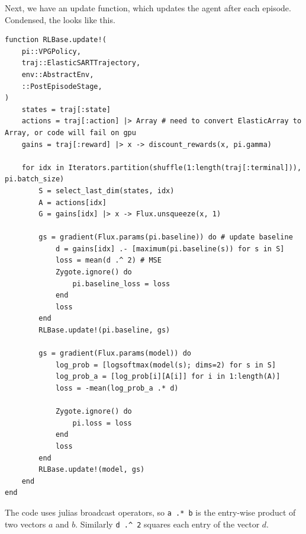 \documentclass{article}
\theoremstyle{changedot}
\theoremstyle{changedotbreak}
\theoremstyle{nonumberplain}
\begin{document}
Next, we have an update function, which updates the agent after each episode. Condensed, the looks like this.

\begin{verbatim}
function RLBase.update!(
    pi::VPGPolicy,
    traj::ElasticSARTTrajectory,
    env::AbstractEnv,
    ::PostEpisodeStage,
)
    states = traj[:state]
    actions = traj[:action] |> Array # need to convert ElasticArray to Array, or code will fail on gpu
    gains = traj[:reward] |> x -> discount_rewards(x, pi.gamma)

    for idx in Iterators.partition(shuffle(1:length(traj[:terminal])), pi.batch_size)
        S = select_last_dim(states, idx)
        A = actions[idx]
        G = gains[idx] |> x -> Flux.unsqueeze(x, 1)

        gs = gradient(Flux.params(pi.baseline)) do # update baseline
            d = gains[idx] .- [maximum(pi.baseline(s)) for s in S]
            loss = mean(d .^ 2) # MSE
            Zygote.ignore() do
                pi.baseline_loss = loss
            end
            loss
        end
        RLBase.update!(pi.baseline, gs)

        gs = gradient(Flux.params(model)) do
            log_prob = [logsoftmax(model(s); dims=2) for s in S]
            log_prob_a = [log_prob[i][A[i]] for i in 1:length(A)]
            loss = -mean(log_prob_a .* d)

            Zygote.ignore() do
                pi.loss = loss
            end
            loss
        end
        RLBase.update!(model, gs)
    end
end
\end{verbatim}

The code uses julias broadcast operators, so \texttt{a .* b} is the entry-wise product of two vectors $a$ and $b$. Similarly \texttt{d .^ 2} squares each entry of the vector $d$.
\end{document}
